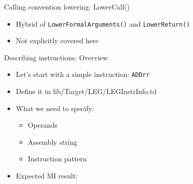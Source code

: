 \begin{frame}{Calling convention lowering: LowerCall()}

\begin{itemize}
    \item Hybrid of \texttt{LowerFormalArguments()} and \texttt{LowerReturn()}
    \item Not explicitly covered here
\end{itemize}

\end{frame}


\begin{frame}{Describing instructions: Overview}

\begin{itemize}
    \item Let's start with a simple instruction: \texttt{ADDrr}
    \item Define it in lib/Target/LEG/LEGInstrInfo.td
    \item What we need to specify:
    \begin{itemize}
        \item Operands
        \item Assembly string
        \item Instruction pattern
    \end{itemize}
    \item Expected MI result:
\end{itemize}


\end{frame}


